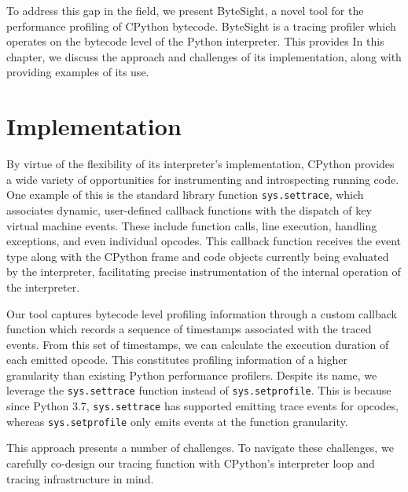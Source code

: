 To address this gap in the field, we present ByteSight, a novel tool for the performance profiling of CPython bytecode.
ByteSight is a tracing profiler which operates on the bytecode level of the Python interpreter. This provides
In this chapter, we discuss the approach and challenges of its implementation, along with providing examples of its use.


\section{Implementation}
\label{sec:profiling-bytecode-implementation}

By virtue of the flexibility of its interpreter's implementation, CPython provides a wide variety of opportunities for instrumenting and introspecting running code.
One example of this is the standard library function \texttt{sys.settrace}, which associates dynamic, user-defined callback functions with the dispatch of key virtual machine events. These include function calls, line execution, handling exceptions, and even individual opcodes.
This callback function receives the event type along with the CPython frame and code objects currently being evaluated by the interpreter, facilitating precise instrumentation of the internal operation of the interpreter.

Our tool captures bytecode level profiling information through a custom callback function which records a sequence of timestamps associated with the traced events.
From this set of timestamps, we can calculate the execution duration of each emitted opcode. This constitutes profiling information of a higher granularity than existing Python performance profilers.
Despite its name, we leverage the \texttt{sys.settrace} function instead of \texttt{sys.setprofile}. This is because since Python 3.7, \texttt{sys.settrace} has supported emitting trace events for opcodes, whereas \texttt{sys.setprofile} only emits events at the function granularity.

This approach presents a number of challenges.
To navigate these challenges, we carefully co-design our tracing function with CPython's interpreter loop and tracing infrastructure in mind.


